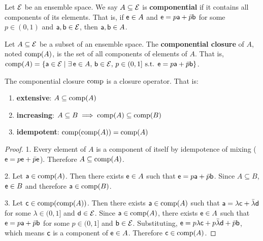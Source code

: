 \begin{mathSection}
	\begin{defn}
		Let $\Ens$ be an ensemble space. We say $A \subseteq \Ens$ is \textbf{componential} if it contains all components of its elements. That is, if $\ens \in A$ and $\ens = p\ens[a] + \bar{p}\ens[b]$ for some $p \in (0,1)$ and $\ens[a], \ens[b] \in \Ens$, then $\ens[a], \ens[b] \in A$.
	\end{defn}
	
	\begin{defn}
		Let $A \subseteq \Ens$ be a subset of an ensemble space. The \textbf{componential closure} of $A$, noted $\component(A)$, is the set of all components of elements of $A$. That is, $\component(A) = \{ \ens[a] \in \Ens \mid \exists\, \ens \in A,\, \ens[b] \in \Ens,\, p \in (0,1] \text{ s.t. } \ens = p\ens[a] + \bar{p}\ens[b] \}$.
	\end{defn}
	\begin{prop}
		The componential closure $\component$ is a closure operator. That is:
		\begin{enumerate}
			\item \textbf{extensive}: $A \subseteq \component(A)$
			\item \textbf{increasing}: $A \subseteq B \implies \component(A) \subseteq \component(B)$
			\item \textbf{idempotent}: $\component(\component(A)) = \component(A)$
		\end{enumerate}
	\end{prop}
	
	\begin{proof}
		1. Every element of $A$ is a component of itself by idempotence of mixing ($\ens = p\ens + \bar{p}\ens$). Therefore $A \subseteq \component(A)$.
		
		2. Let $\ens[a] \in \component(A)$. Then there exists $\ens \in A$ such that $\ens = p\ens[a] + \bar{p}\ens[b]$. Since $A \subseteq B$, $\ens \in B$ and therefore $\ens[a] \in \component(B)$.
		
		3. Let $\ens[c] \in \component(\component(A))$. Then there exists $\ens[a] \in \component(A)$ such that $\ens[a] = \lambda\ens[c] + \bar{\lambda}\ens[d]$ for some $\lambda \in (0,1]$ and $\ens[d] \in \Ens$. Since $\ens[a] \in \component(A)$, there exists $\ens \in A$ such that $\ens = p\ens[a] + \bar{p}\ens[b]$ for some $p \in (0,1]$ and $\ens[b] \in \Ens$. Substituting, $\ens = p\lambda\ens[c] + p\bar{\lambda}\ens[d] + \bar{p}\ens[b]$, which means $\ens[c]$ is a component of $\ens \in A$. Therefore $\ens[c] \in \component(A)$.
	\end{proof}
	

\end{mathSection}
